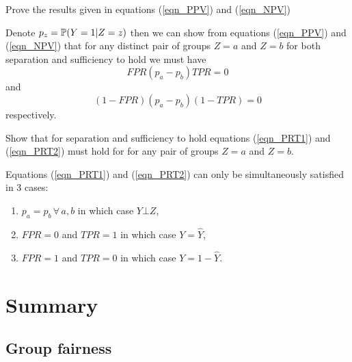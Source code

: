 \begin{lookbox}
Prove the results given in equations (\ref{eqn_PPV}) and (\ref{eqn_NPV})
\end{lookbox}

Denote $p_z=\mathbb{P}(Y=1|Z=z)$ then we can show from equations (\ref{eqn_PPV}) and (\ref{eqn_NPV}) that for any distinct pair of groups $Z=a$ and $Z=b$ for both separation and sufficiency to hold we must have
\begin{equation} \label{eqn_PRT1}
FPR (p_a-p_b) TPR = 0
\end{equation}
and
\begin{equation} \label{eqn_PRT2}
(1-FPR) (p_a-p_b) (1-TPR) = 0
\end{equation}
respectively.

\begin{lookbox}
Show that for separation and sufficiency to hold equations (\ref{eqn_PRT1}) and (\ref{eqn_PRT2}) must hold for  for any pair of groups $Z=a$ and $Z=b$.
\end{lookbox} 

Equations (\ref{eqn_PRT1}) and (\ref{eqn_PRT2}) can only be simultaneously satisfied in 3 cases:
\begin{enumerate}
\item $p_a=p_b \, \forall \, a, b$ in which case $Y \bot Z$,
\item $FPR=0$ and $TPR=1$ in which case $Y=\hat{Y}$,
\item $FPR=1$ and $TPR=0$ in which case $Y=1-\hat{Y}$.
\end{enumerate}

\section*{Summary}

\subsection*{Group fairness}

